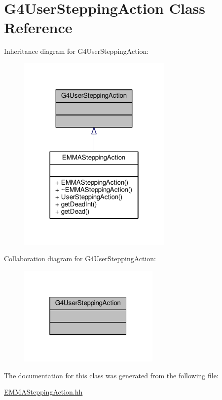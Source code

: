 \hypertarget{classG4UserSteppingAction}{}\section{G4\+User\+Stepping\+Action Class Reference}
\label{classG4UserSteppingAction}


Inheritance diagram for G4\+User\+Stepping\+Action\+:
\nopagebreak
\begin{figure}[H]
\begin{center}
\leavevmode
\includegraphics[width=214pt]{classG4UserSteppingAction__inherit__graph}
\end{center}
\end{figure}


Collaboration diagram for G4\+User\+Stepping\+Action\+:
\nopagebreak
\begin{figure}[H]
\begin{center}
\leavevmode
\includegraphics[width=196pt]{classG4UserSteppingAction__coll__graph}
\end{center}
\end{figure}


The documentation for this class was generated from the following file\+:\begin{DoxyCompactItemize}
\item 
\hyperlink{EMMASteppingAction_8hh}{E\+M\+M\+A\+Stepping\+Action.\+hh}\end{DoxyCompactItemize}
